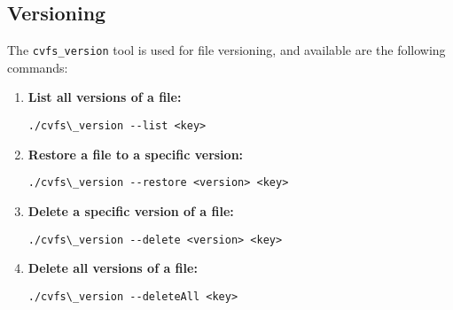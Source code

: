 \subsection*{Versioning}

The \texttt{cvfs\_version} tool is used for file versioning, and available are the following commands:

\begin{enumerate}
    \setlength\itemsep{-0.1em}
    \item \textbf{List all versions of a file:} \\
    \begin{BVerbatim}[baseline=t,boxwidth=10cm]
  ./cvfs\_version --list <key>
    \end{BVerbatim}

    \item \textbf{Restore a file to a specific version:} \\
    \begin{BVerbatim}[baseline=t,boxwidth=10cm]
  ./cvfs\_version --restore <version> <key>
    \end{BVerbatim}

    \item \textbf{Delete a specific version of a file:} \\
    \begin{BVerbatim}[baseline=t,boxwidth=10cm]
  ./cvfs\_version --delete <version> <key>
    \end{BVerbatim}

    \item \textbf{Delete all versions of a file:} \\
    \begin{BVerbatim}[baseline=t,boxwidth=10cm]
  ./cvfs\_version --deleteAll <key>
    \end{BVerbatim}
\end{enumerate}